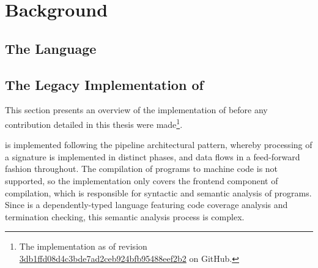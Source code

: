 \chapter{Background}

\section{The \Beluga Language}


\section{The Legacy Implementation of \Beluga} \label{section:beluga-implementation}

This section presents an overview of the implementation of \Beluga before any contribution detailed in this thesis were made\footnote{The implementation as of revision \href{https://github.com/Beluga-lang/Beluga/tree/3db1ffd08d4c3bde7ad2ceb924bfb95488eef2b2}{3db1ffd08d4c3bde7ad2ceb924bfb95488eef2b2} on GitHub.}.

\Beluga is implemented following the pipeline architectural pattern, whereby processing of a \Beluga signature is implemented in distinct phases, and data flows in a feed-forward fashion throughout.
The compilation of \Beluga programs to machine code is not supported, so the implementation only covers the frontend component of compilation, which is responsible for syntactic and semantic analysis of programs.
Since \Beluga is a dependently-typed language featuring code coverage analysis and termination checking, this semantic analysis process is complex.

